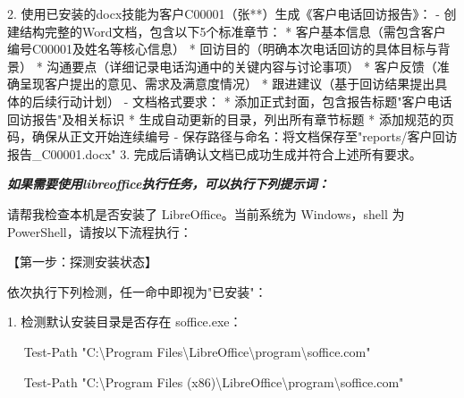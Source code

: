 \documentclass[
  american,
  chinese,
]{ctexart}
\renewcommand{\ul}[1]{#1}
\begin{document}
\foreignlanguage{american}{2. }{使用已安装的}\foreignlanguage{american}{docx}{技能为客户}\foreignlanguage{american}{C00001}{（张}\foreignlanguage{american}{**}{）生成《客户电话回访报告》：}\foreignlanguage{american}{ - }{创建结构完整的}\foreignlanguage{american}{Word}{文档，包含以下}\foreignlanguage{american}{5}{个标准章节：}\foreignlanguage{american}{ * }{客户基本信息（需包含客户编号}\foreignlanguage{american}{C00001}{及姓名等核心信息）}\foreignlanguage{american}{ * }{回访目的（明确本次电话回访的具体目标与背景）}\foreignlanguage{american}{ * }{沟通要点（详细记录电话沟通中的关键内容与讨论事项）}\foreignlanguage{american}{ * }{客户反馈（准确呈现客户提出的意见、需求及满意度情况）}\foreignlanguage{american}{ * }{跟进建议（基于回访结果提出具体的后续行动计划）}\foreignlanguage{american}{ - }{文档格式要求：}\foreignlanguage{american}{ * }{添加正式封面，包含报告标题}\foreignlanguage{american}{"}{客户电话回访报告}\foreignlanguage{american}{"}{及相关标识}\foreignlanguage{american}{ * }{生成自动更新的目录，列出所有章节标题}\foreignlanguage{american}{ * }{添加规范的页码，确保从正文开始连续编号}\foreignlanguage{american}{ - }{保存路径与命名：将文档保存至}\foreignlanguage{american}{"reports/}{客户回访报告}\foreignlanguage{american}{\_C00001.docx"
3. }{完成后请确认文档已成功生成并符合上述所有要求。}\foreignlanguage{american}{}

\textbf{\emph{\ul{{如果需要使用}}}}{\textbf{\emph{\ul{\foreignlanguage{american}{libreoffice}}}}}\textbf{\emph{\ul{{执行任务，可以执行下列提示词：}}}\emph{\ul{\foreignlanguage{american}{}}}}

{请帮我检查本机是否安装了}\foreignlanguage{american}{ LibreOffice}{。当前系统为}\foreignlanguage{american}{ Windows}{，}\foreignlanguage{american}{shell }{为}\foreignlanguage{american}{ PowerShell}{，请按以下流程执行：}\foreignlanguage{american}{}

{【第一步：探测安装状态】}\foreignlanguage{american}{}

{依次执行下列检测，任{一}命中即视为}\foreignlanguage{american}{"}{已安装}\foreignlanguage{american}{"}{：}\foreignlanguage{american}{}

\foreignlanguage{american}{1. }{检测默认安装目录是否存在}\foreignlanguage{american}{ soffice.exe}{：}\foreignlanguage{american}{}

\foreignlanguage{american}{{~~ }Test-Path "C:\textbackslash Program
Files\textbackslash LibreOffice\textbackslash program\textbackslash soffice.com"}

\foreignlanguage{american}{{~~ }Test-Path "C:\textbackslash Program Files
(x{86)\textbackslash LibreOffice\textbackslash program\textbackslash soffice.com}"}
\end{document}
